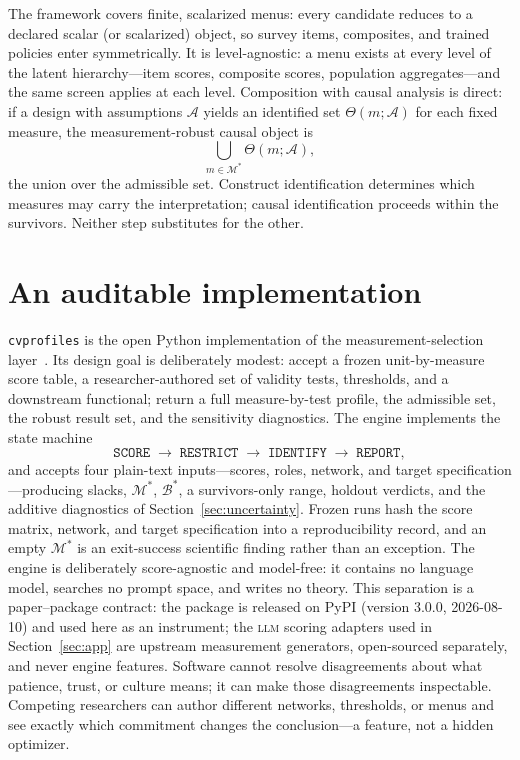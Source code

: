 \documentclass[10pt,letterpaper]{article}
\newcommand{\LLM}{\textsc{llm}}
\newcommand{\cvp}{\texttt{cvprofiles}}
\newcommand{\M}{\ensuremath{\mathcal{M}}}
\newcommand{\Bset}{\mathcal{B}}
\begin{document}
The framework covers finite, scalarized menus: every candidate reduces to a declared scalar (or scalarized) object, so survey items, composites, and trained policies enter symmetrically.
It is level-agnostic: a menu exists at every level of the latent hierarchy---item scores, composite scores, population aggregates---and the same screen applies at each level.
Composition with causal analysis is direct: if a design with assumptions $\mathcal{A}$ yields an identified set $\Theta(m;\mathcal{A})$ for each fixed measure, the measurement-robust causal object is
\begin{equation}
\bigcup_{m\in\M^*}\Theta(m;\mathcal{A}),
\label{eq:compose}
\end{equation}
the union over the admissible set.
Construct identification determines which measures may carry the interpretation; causal identification proceeds within the survivors.
Neither step substitutes for the other.

\section{An auditable implementation}
\label{sec:impl}

\cvp{} is the open Python implementation of the measurement-selection layer~\cite{cvprofiles}.
Its design goal is deliberately modest: accept a frozen unit-by-measure score table, a researcher-authored set of validity tests, thresholds, and a downstream functional; return a full measure-by-test profile, the admissible set, the robust result set, and the sensitivity diagnostics.
The engine implements the state machine
\begin{equation}
\texttt{SCORE} \;\longrightarrow\; \texttt{RESTRICT} \;\longrightarrow\; \texttt{IDENTIFY} \;\longrightarrow\; \texttt{REPORT},
\label{eq:statemachine}
\end{equation}
and accepts four plain-text inputs---scores, roles, network, and target specification---producing slacks, $\M^*$, $\Bset^*$, a survivors-only range, holdout verdicts, and the additive diagnostics of Section~\ref{sec:uncertainty}.
Frozen runs hash the score matrix, network, and target specification into a reproducibility record, and an empty $\M^*$ is an exit-success scientific finding rather than an exception.
The engine is deliberately score-agnostic and model-free: it contains no language model, searches no prompt space, and writes no theory.
This separation is a paper--package contract: the package is released on PyPI (version 3.0.0, 2026-08-10) and used here as an instrument; the \LLM{} scoring adapters used in Section~\ref{sec:app} are upstream measurement generators, open-sourced separately, and never engine features.
Software cannot resolve disagreements about what patience, trust, or culture means; it can make those disagreements inspectable.
Competing researchers can author different networks, thresholds, or menus and see exactly which commitment changes the conclusion---a feature, not a hidden optimizer.
\end{document}
